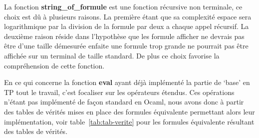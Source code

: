 \documentclass[12pt]{article}
\begin{document}
    La fonction \textbf{string\_of\_formule} est une fonction récursive non 
    terminale, ce choix est dû à plusieurs raisons. La première étant que sa 
    complexité espace sera logarithmique par la division de la formule par deux
    a chaque appel récursif. La deuxième raison réside dans l'hypothèse que les
    formule afficher ne devrais pas être d'une taille démesurée enfaite une 
    formule trop grande ne pourrait pas être affichée sur un terminal de taille
    standard. De plus ce choix favorise la compréhension de cette fonction.

    En ce qui concerne la fonction \textbf{eval} ayant déjà implémenté la
    partie de `base' en TP tout le travail, c'est focaliser sur les opérateurs
    étendus. Ces opérations n'étant pas implémenté de façon standard en Ocaml,
    nous avons donc à partir des tables de vérités mises en place des formules 
    équivalente permettant alors leur implémentation, voir 
    table~\ref{tab:tab-verite} pour les formules équivalente résultant des 
    tables de vérités.  
\end{document}

